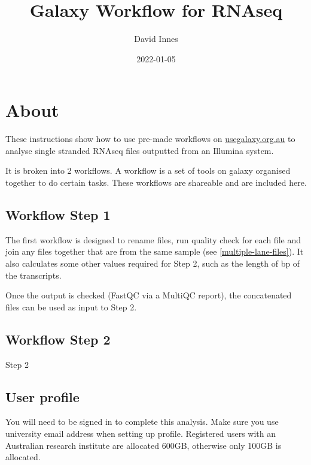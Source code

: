\documentclass[
]{book}
\title{Galaxy Workflow for RNAseq}
\author{David Innes}
\date{2022-01-05}
\begin{document}
\maketitle

{
\setcounter{tocdepth}{1}
\tableofcontents
}
\hypertarget{about}{%
\chapter{About}\label{about}}

These instructions show how to use pre-made workflows on \url{usegalaxy.org.au}
to analyse single stranded RNAseq files outputted from an Illumina system.

It is broken into 2 workflows. A workflow is a set of tools on galaxy organised together to do certain tasks. These workflows are shareable and are included here.

\hypertarget{workflow-step-1}{%
\section*{Workflow Step 1}\label{workflow-step-1}}

The first workflow is designed to rename files, run quality check for each file and join any files together that are from the same sample (see \ref{multiple-lane-files}). It also calculates some other values required for Step 2, such as the length of bp of the transcripts.

Once the output is checked (FastQC via a MultiQC report), the concatenated files can be used as input to Step 2.

\hypertarget{workflow-step-2}{%
\section*{Workflow Step 2}\label{workflow-step-2}}

Step 2

\hypertarget{user-profile}{%
\section*{User profile}\label{user-profile}}

You will need to be signed in to complete this analysis. Make sure you use university email address when setting up profile. Registered users with an Australian research institute are allocated 600GB, otherwise only 100GB is allocated.
\end{document}
